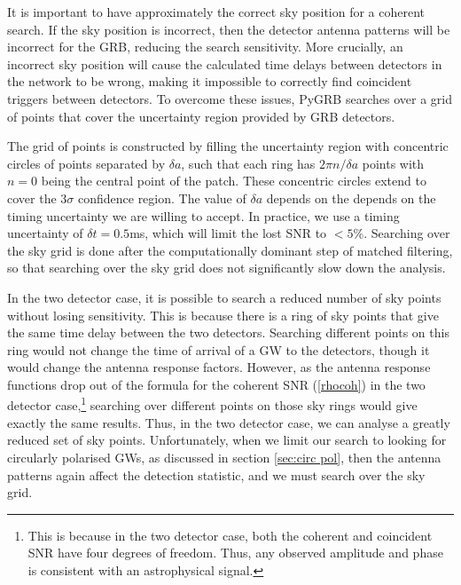 \documentclass[11pt]{cuthesis}
\begin{document}
It is important to have approximately the correct sky position for a coherent search. If the sky position is incorrect, then the detector antenna patterns will be incorrect for the GRB, reducing the search sensitivity. More crucially, an incorrect sky position will cause the calculated time delays between detectors in the network to be wrong, making it impossible to correctly find coincident triggers between detectors. To overcome these issues, PyGRB searches over a grid of points that cover the uncertainty region provided by GRB detectors\cite{pygrb_Williamson:2014}\cite{was_sky_grid}. 

The grid of points is constructed by filling the uncertainty region with concentric circles of points separated by $\delta a$, such that each ring has $2\pi n / \delta a$ points with $n=0$ being the central point of the patch. These concentric circles extend to cover the $3\sigma$ confidence region. The value of $\delta a$ depends on the depends on the timing uncertainty we are willing to accept. In practice, we use a timing uncertainty of $\delta t = 0.5$ms, which will limit the lost SNR to $<5\%$\cite{pygrb_Williamson:2014}. Searching over the sky grid is done after the computationally dominant step of matched filtering, so that searching over the sky grid does not significantly slow down the analysis.

In the two detector case, it is possible to search a reduced number of sky points without losing sensitivity. This is because there is a ring of sky points that give the same time delay between the two detectors. Searching different points on this ring would not change the time of arrival of a GW to the detectors, though it would change the antenna response factors. However, as the antenna response functions drop out of the formula for the coherent SNR (\ref{rhocoh}) in the two detector case,\footnote{This is because in the two detector case, both the coherent and coincident SNR have four degrees of freedom. Thus, any observed amplitude and phase is consistent with an astrophysical signal.} searching over different points on those sky rings would give exactly the same results. Thus, in the two detector case, we can analyse a greatly reduced set of sky points. Unfortunately, when we limit our search to looking for circularly polarised GWs, as discussed in section \ref{sec:circ pol}, then the antenna patterns again affect the detection statistic, and we must search over the sky grid.
\end{document}
